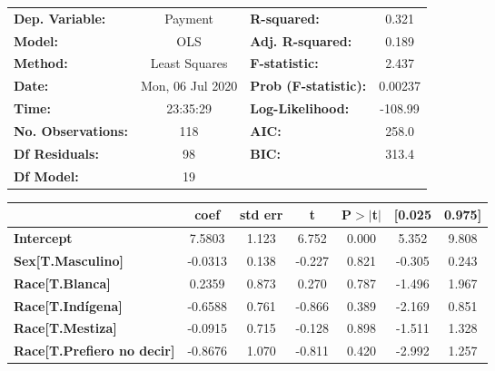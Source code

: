 \documentclass{report}
\begin{document}
\begin{center}
\begin{tabular}{lclc}
\toprule
\textbf{Dep. Variable:}            &     Payment      & \textbf{  R-squared:         } &     0.321   \\
\textbf{Model:}                    &       OLS        & \textbf{  Adj. R-squared:    } &     0.189   \\
\textbf{Method:}                   &  Least Squares   & \textbf{  F-statistic:       } &     2.437   \\
\textbf{Date:}                     & Mon, 06 Jul 2020 & \textbf{  Prob (F-statistic):} &  0.00237    \\
\textbf{Time:}                     &     23:35:29     & \textbf{  Log-Likelihood:    } &   -108.99   \\
\textbf{No. Observations:}         &         118      & \textbf{  AIC:               } &     258.0   \\
\textbf{Df Residuals:}             &          98      & \textbf{  BIC:               } &     313.4   \\
\textbf{Df Model:}                 &          19      & \textbf{                     } &             \\
\bottomrule
\end{tabular}
\begin{tabular}{lcccccc}
                                   & \textbf{coef} & \textbf{std err} & \textbf{t} & \textbf{P$> |$t$|$} & \textbf{[0.025} & \textbf{0.975]}  \\
\midrule
\textbf{Intercept}                 &       7.5803  &        1.123     &     6.752  &         0.000        &        5.352    &        9.808     \\
\textbf{Sex[T.Masculino]}          &      -0.0313  &        0.138     &    -0.227  &         0.821        &       -0.305    &        0.243     \\
\textbf{Race[T.Blanca]}            &       0.2359  &        0.873     &     0.270  &         0.787        &       -1.496    &        1.967     \\
\textbf{Race[T.Indígena]}          &      -0.6588  &        0.761     &    -0.866  &         0.389        &       -2.169    &        0.851     \\
\textbf{Race[T.Mestiza]}           &      -0.0915  &        0.715     &    -0.128  &         0.898        &       -1.511    &        1.328     \\
\textbf{Race[T.Prefiero no decir]} &      -0.8676  &        1.070     &    -0.811  &         0.420        &       -2.992    &        1.257     \\

\end{tabular}
\end{center}
\end{document}
